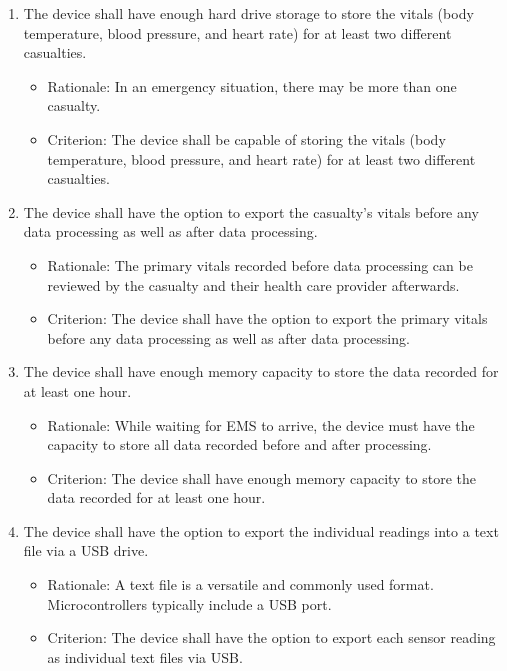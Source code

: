 \documentclass{article}
\begin{document}
    \begin{enumerate}[label = \textbf{{FR8.}\arabic*}]
	    \item The device shall have enough hard drive storage to store the vitals (body temperature, blood pressure, and heart rate) for at least two different casualties.
	        \begin{itemize}
	            \item Rationale: In an emergency situation, there may be more than one casualty. 
	            \item Criterion: The device shall be capable of storing the vitals (body temperature, blood pressure, and heart rate) for at least two different casualties.
	        \end{itemize}
	   
	    \item The device shall have the option to export the casualty's vitals before any data processing as well as after data processing.
	        \begin{itemize}
	            \item Rationale: The primary vitals recorded before data processing can be reviewed by the casualty and their health care provider afterwards.    
	            \item Criterion: The device shall have the option to export the primary vitals before any data processing as well as after data processing.
	        \end{itemize}	     
	        
	   \item \label{mem} The device shall have enough memory capacity to store the data recorded for at least one hour.
	        \begin{itemize}
	            \item Rationale: While waiting for EMS to arrive, the device must have the capacity to store all data recorded before and after processing.
	            \item Criterion: The device shall have enough memory capacity to store the data recorded for at least one hour. 
	        \end{itemize} 

	  	\item The device shall have the option to export the individual readings into a text file via a USB drive.
	  	    \begin{itemize}
	  	        \item Rationale: A text file is a versatile and commonly used format.  Microcontrollers typically include a USB port.
	  	        \item Criterion: The device shall have the option to export each sensor reading as individual text files via USB.
	  	    \end{itemize}	


\end{enumerate}
\end{document}
